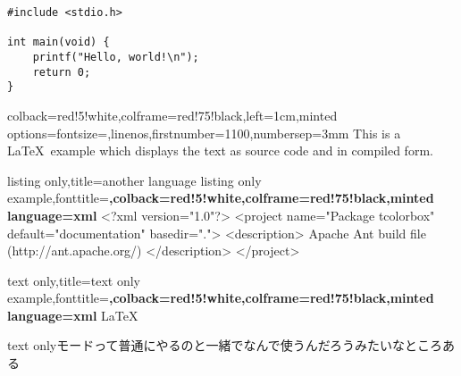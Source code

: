 \documentclass[a4paper,10pt,uplatex,landscape,papersize]{jsarticle}
\begin{document}
\begin{verbatim}
#include <stdio.h>

int main(void) {
    printf("Hello, world!\n");
    return 0;
}
\end{verbatim}

\begin{tcblisting}{colback=red!5!white,colframe=red!75!black,left=1cm,minted options={fontsize=\small,linenos,firstnumber=1100,numbersep=3mm}}
This is a \LaTeX\ example which displays the text as source code
and in compiled form.
\end{tcblisting}

\begin{tcblisting}{listing only,title=another language listing only example,fonttitle=\bfseries,colback=red!5!white,colframe=red!75!black,minted language=xml}
<?xml version="1.0"?>
<project name="Package tcolorbox" default="documentation" basedir="."> <description>
       Apache Ant build file (http://ant.apache.org/)
     </description>
   </project>
\end{tcblisting}

\begin{tcblisting}{text only,title=text only example,fonttitle=\bfseries,colback=red!5!white,colframe=red!75!black,minted language=xml}
\LaTeX

text onlyモードって普通にやるのと一緒でなんで使うんだろうみたいなところある
\end{tcblisting}
\end{document}

